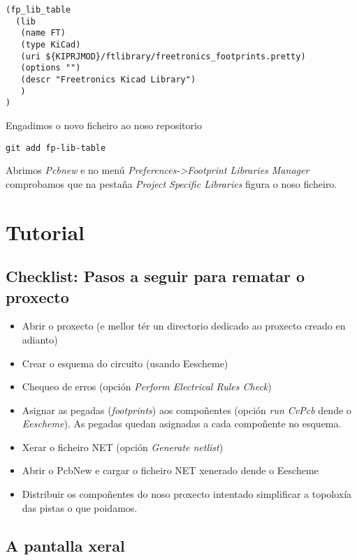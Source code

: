 \begin{verbatim}
(fp_lib_table
  (lib
   (name FT)
   (type KiCad)
   (uri ${KIPRJMOD}/ftlibrary/freetronics_footprints.pretty)
   (options "")
   (descr "Freetronics Kicad Library")
   )
)
\end{verbatim}

Engadimos o novo ficheiro ao noso repositorio

\begin{verbatim}
git add fp-lib-table
\end{verbatim}

Abrimos \emph{Pcbnew} e no menú
\emph{Preferences-\textgreater{}Footprint Libraries Manager} comprobamos
que na pestaña \emph{Project Specific Libraries} figura o noso ficheiro.

\section{Tutorial}\label{tutorial}

\subsection{Checklist: Pasos a seguir para rematar o
proxecto}\label{checklist-pasos-a-seguir-para-rematar-o-proxecto}

\begin{itemize}
\itemsep1pt\parskip0pt
\item
  Abrir o proxecto (e mellor tér un directorio dedicado ao proxecto
  creado en adianto)
\item
  Crear o esquema do circuito (usando Eescheme)
\item
  Chequeo de erros (opción \emph{Perform Electrical Rules Check})
\item
  Asignar as pegadas (\emph{footprints}) aos compoñentes (opción
  \emph{run CvPcb} dende o \emph{Eescheme}). As pegadas quedan asignadas
  a cada compoñente no esquema.
\item
  Xerar o ficheiro NET (opción \emph{Generate netlist})
\item
  Abrir o PcbNew e cargar o ficheiro NET xenerado dende o Eescheme
\item
  Distribuir os compoñentes do noso proxecto intentado simplificar a
  topoloxía das pistas o que poidamos.
\end{itemize}

\subsection{A pantalla xeral}\label{a-pantalla-xeral}

